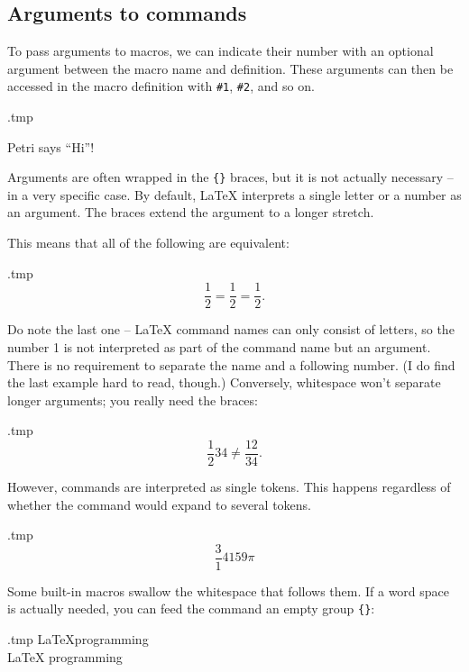 %
\subsection{Arguments to commands}

To pass arguments to macros, we can indicate their number with an optional argument
between the macro name and definition.
These arguments can then be accessed in the macro definition with \verb|#1|, \verb|#2|, and so on.

\begin{VerbatimOut}{\jobname.tmp}
\newcommand{\say}[2]{#1 says ``#2''!}

\say{Petri}{Hi}
\end{VerbatimOut}
\ShowExample

Arguments are often wrapped in the \verb|{}| braces,
but it is not actually necessary -- in a very specific case.
By default, \LaTeX{} interprets a single letter or a number as an argument.
The braces extend the argument to a longer stretch.

This means that all of the following are equivalent:

\begin{VerbatimOut}{\jobname.tmp}
\[
\frac{1}{2}
= \frac 1 2
= \frac12.
\]
\end{VerbatimOut}
\ShowExample

Do note the last one -- \LaTeX{} command names can only consist of letters,
so the number 1 is not interpreted as part of the command name but an argument.
There is no requirement to separate the name and a following number.
(I do find the last example hard to read, though.)
Conversely, whitespace won't separate longer arguments; you really need the braces:

\begin{VerbatimOut}{\jobname.tmp}
\[
\frac 12 34
\neq \frac {12} {34}.
\]
\end{VerbatimOut}
\ShowExample

However, commands are interpreted as single tokens.
This happens regardless of whether the command would expand to several tokens.

\begin{VerbatimOut}{\jobname.tmp}
\newcommand{\magic}{314 159}
\[ \frac \magic \pi \]
\end{VerbatimOut}
\ShowExample

\begin{gotcha}
Some built-in macros swallow the whitespace that follows them.
If a word space is actually needed, you can feed the command an empty group \verb|{}|:
\begin{VerbatimOut}{\jobname.tmp}
\LaTeX programming\\
\LaTeX{} programming
\end{VerbatimOut}
\ShowExample
\end{gotcha}


